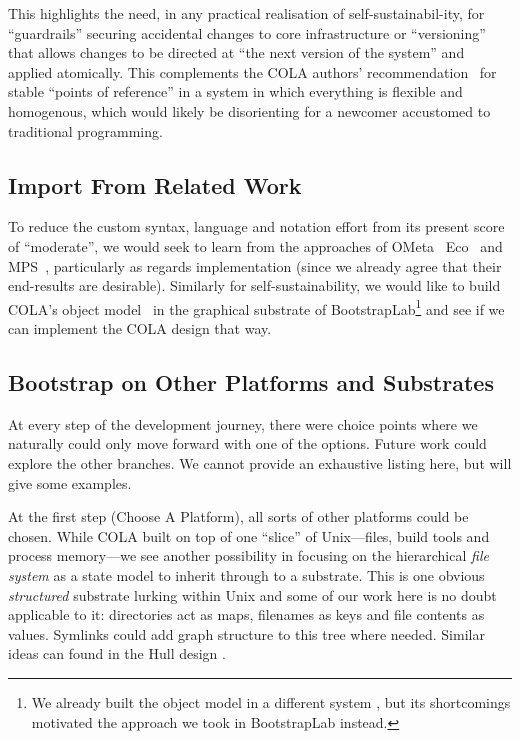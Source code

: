 \documentclass[ twoside,openright,titlepage,numbers=noenddot,headinclude,footinclude,cleardoublepage=empty,abstract=on,
                BCOR=5mm,paper=a4,fontsize=11pt
                ]{scrreprt}
\newcommand{\tomas}[1]{}
\theoremstyle{definition}
\begin{document}
This highlights the need, in any practical realisation of
self-sustainabil-ity, for ``guardrails'' securing accidental changes to
core infrastructure or ``versioning'' that allows changes to be directed
at ``the next version of the system'' and applied atomically. This
complements the \ac{COLA} authors'
recommendation~\parencite[p. 23]{COLAs} for stable ``points of
reference'' in a system in which everything is flexible and homogenous,
which would likely be disorienting for a newcomer accustomed to
traditional programming.

\hypertarget{import-from-related-work}{\subsection{Import From Related Work}\label{import-from-related-work}}

To reduce the custom syntax, language and notation effort from its
present score of ``moderate'', we would seek to learn from the
approaches of OMeta~\parencite{OMeta} Eco~\parencite{Eco} and
MPS~\parencite{MPS}, particularly as regards implementation (since we
already agree that their end-results are desirable). Similarly for
self-sustainability, we would like to build \ac{COLA}'s object
model~\parencite{OROM} in the graphical substrate of
BootstrapLab\footnote{We already built the object model in a different
  system \parencite{CCS20}, but its shortcomings motivated the approach
  we took in BootstrapLab instead.} and see if we can implement the
\ac{COLA} design that way.

\tomas{Possibly draw a diagram of what are all the things that have to match? Like code-data in substrate, substrate-highLevelLanguage etc.}

\hypertarget{bootstrap-on-other-platforms-and-substrates}{\subsection{Bootstrap on Other Platforms and
Substrates}\label{bootstrap-on-other-platforms-and-substrates}}

At every step of the development journey, there were choice points where
we naturally could only move forward with one of the options. Future
work could explore the other branches. We cannot provide an exhaustive
listing here, but will give some examples.

At the first step (Choose A Platform), all sorts of other platforms
could be chosen. While \ac{COLA} built on top of one ``slice'' of
Unix---files, build tools and process memory---we see another
possibility in focusing on the hierarchical \emph{file system} as a
state model to inherit through to a substrate. This is one obvious
\emph{structured} substrate lurking within Unix and some of our work
here is no doubt applicable to it: directories act as maps, filenames as
keys and file contents as values. Symlinks could add graph structure to
this tree where needed. Similar ideas can found in the Hull design
\parencite{Hull}.
\end{document}
